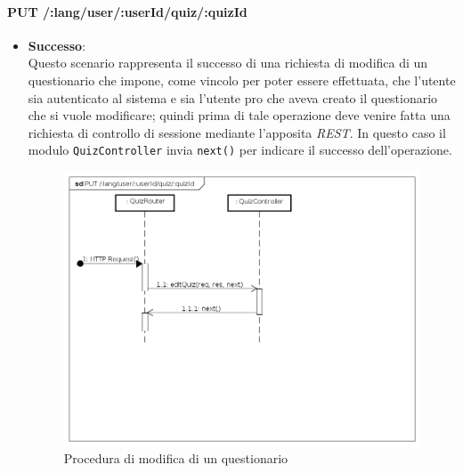\paragraph{PUT /:lang/user/:userId/quiz/:quizId} %
\begin{itemize}
\item \textbf{Successo}:\\
Questo scenario rappresenta il successo di una richiesta di modifica di un questionario che impone, come vincolo per poter essere effettuata, che l'utente sia autenticato al sistema e sia l'utente pro che aveva creato il questionario che si vuole modificare; quindi prima di tale operazione deve venire fatta una richiesta di controllo di sessione mediante l'apposita \textit{REST}. In questo caso il modulo \texttt{QuizController} invia \texttt{next()} per indicare il successo dell'operazione.
\label{Procedura di modifica di un questionario}
\begin{figure}[ht]
	\centering
	\includegraphics[scale=0.40]{UML/DiagrammiDiSequenza/Back-end/PUT__lang_user_userId_quiz_quizId_success.png}
	\caption{Procedura di modifica di un questionario}
\end{figure}
\FloatBarrier


\end{itemize}
